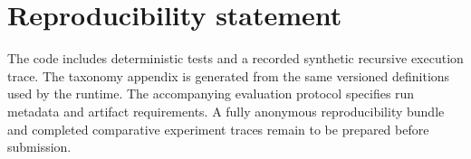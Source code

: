 \documentclass{article}
\begin{document}
\section*{Reproducibility statement}
The code includes deterministic tests and a recorded synthetic recursive execution trace. The taxonomy appendix is generated from the same versioned definitions used by the runtime. The accompanying evaluation protocol specifies run metadata and artifact requirements. A fully anonymous reproducibility bundle and completed comparative experiment traces remain to be prepared before submission.



\appendix

\end{document}
